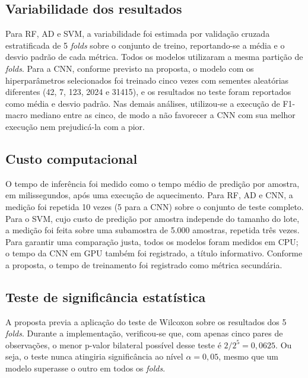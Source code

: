 \subsection{Variabilidade dos resultados}

Para RF, AD e SVM, a variabilidade foi estimada por validação cruzada estratificada de 5 \textit{folds} sobre o conjunto de treino, reportando-se a média e o desvio padrão de cada métrica. Todos os modelos utilizaram a mesma partição de \textit{folds}. Para a CNN, conforme previsto na proposta, o modelo com os hiperparâmetros selecionados foi treinado cinco vezes com sementes aleatórias diferentes (42, 7, 123, 2024 e 31415), e os resultados no teste foram reportados como média e desvio padrão. Nas demais análises, utilizou-se a execução de F1-macro mediano entre as cinco, de modo a não favorecer a CNN com sua melhor execução nem prejudicá-la com a pior.

\subsection{Custo computacional}

O tempo de inferência foi medido como o tempo médio de predição por amostra, em milissegundos, após uma execução de aquecimento. Para RF, AD e CNN, a medição foi repetida 10 vezes (5 para a CNN) sobre o conjunto de teste completo. Para o SVM, cujo custo de predição por amostra independe do tamanho do lote, a medição foi feita sobre uma subamostra de 5.000 amostras, repetida três vezes. Para garantir uma comparação justa, todos os modelos foram medidos em CPU; o tempo da CNN em GPU também foi registrado, a título informativo. Conforme a proposta, o tempo de treinamento foi registrado como métrica secundária.

\subsection{Teste de significância estatística}
\label{sec:estatistica}

A proposta previa a aplicação do teste de Wilcoxon sobre os resultados dos 5 \textit{folds}. Durante a implementação, verificou-se que, com apenas cinco pares de observações, o menor p-valor bilateral possível desse teste é $2/2^5 = 0{,}0625$. Ou seja, o teste nunca atingiria significância ao nível $\alpha = 0{,}05$, mesmo que um modelo superasse o outro em todos os \textit{folds}.

